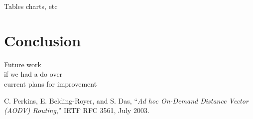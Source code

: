 \documentclass[12pt]{article}
\begin{document}
Tables charts, etc

\section{Conclusion}

Future work \\
if we had a do over\\

current plans for improvement

\begin{thebibliography}{1}

C. Perkins,  E. Belding-Royer, and  S. Das, ``\emph{Ad hoc On-Demand
Distance Vector (AODV) Routing},'' IETF RFC 3561, July 2003.

\end{thebibliography}
\end{document}
